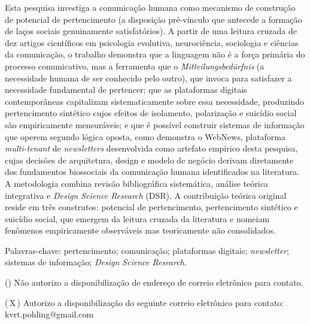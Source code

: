 \documentclass[12pt,a4paper]{article}
\begin{document}
\begin{singlespace}
Esta pesquisa investiga a comunicação humana
como mecanismo de construção de potencial de
pertencimento (a disposição pré-vínculo que antecede
a formação de laços sociais genuinamente satisfatórios).
A partir de uma leitura cruzada de dez artigos científicos
em psicologia evolutiva, neurociência, sociologia e
ciências da comunicação, o trabalho demonstra que a
linguagem não é a força primária do processo comunicativo,
mas a ferramenta que o \textit{Mitteilungsbedürfnis}
(a necessidade humana de ser conhecido pelo outro), que invoca
para satisfazer a necessidade fundamental de pertencer;
que as plataformas digitais contemporâneas capitalizam
sistematicamente sobre essa necessidade, produzindo
pertencimento sintético cujos efeitos de
isolamento, polarização e suicídio social são
empiricamente mensuráveis; e que é possível construir
sistemas de informação que operem segundo lógica oposta,
como demonstra o WebNews, plataforma \textit{multi-tenant} de
\textit{newsletters} desenvolvida como artefato empírico desta
pesquisa, cujas decisões de arquitetura, design e modelo
de negócio derivam diretamente dos fundamentos biossociais
da comunicação humana identificados na literatura. A
metodologia combina revisão bibliográfica sistemática,
análise teórica integrativa e \textit{Design Science
Research} (DSR). A contribuição teórica original reside
em três construtos: potencial de pertencimento,
pertencimento sintético e suicídio social,
que emergem da leitura cruzada da literatura e nomeiam
fenômenos empiricamente observáveis mas teoricamente não
consolidados.
\par
\end{singlespace}

\vspace{0.6cm}

\begin{singlespace}
\raggedright
Palavras-chave: pertencimento; comunicação; plataformas digitais;
\textit{newsletter}; sistemas de informação; \textit{Design Science Research}.
\par
\end{singlespace}

\vspace{1.2cm}

(\quad) Não autorizo a disponibilização de endereço de correio eletrônico para contato.

\vspace{0.3cm}

(\,X\,) Autorizo a disponibilização do seguinte correio eletrônico para contato:\\
kvrt.pohling@gmail.com
\clearpage
\end{document}
